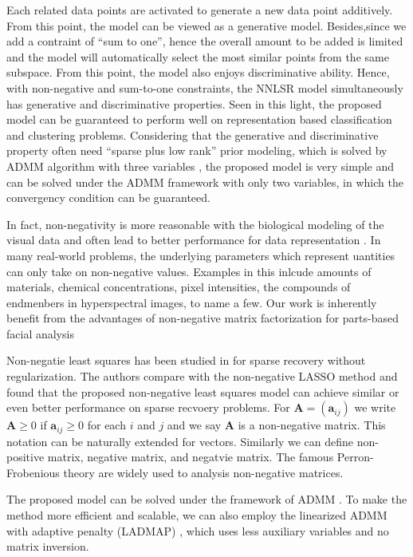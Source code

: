 \documentclass[10pt,twocolumn,letterpaper]{article}
\begin{document}
Each related data points are activated to generate a new data point additively. From this point, the model can be viewed as a generative model. Besides,since we add a contraint of ``sum to one'', hence the overall amount to be added is limited and the model will automatically select the most similar points from the same subspace. From this point, the model also enjoys discriminative ability. Hence, with non-negative and sum-to-one constraints, the NNLSR model simultaneously has generative and discriminative properties. Seen in this light, the proposed model can be guaranteed to perform well on representation based classification and clustering problems. Considering that the generative and discriminative property often need ``sparse plus low rank'' prior modeling, which is solved by ADMM algorithm with three variables \cite{nnlrs}, the proposed model is very simple and can be solved under the ADMM framework with only two variables, in which the convergency condition can be guaranteed.


In fact, non-negativity is more reasonable with the biological modeling of the visual data and often lead to better performance for data representation \cite{nmfnature}. In many real-world problems, the underlying parameters which represent uantities can only take on non-negative values. Examples in this inlcude amounts of materials, chemical concentrations, pixel intensities, the compounds of endmenbers in hyperspectral images, to name a few. Our work is inherently benefit from the advantages of non-negative matrix factorization for parts-based facial analysis \cite{nmfnature}
 
Non-negatie least squares has been studied in \cite{slawski2013non} for sparse recovery without regularization. The authors compare with the non-negative LASSO method \cite{kim2007interior} and found that the proposed non-negative least squares model can achieve similar or even better performance on sparse recvoery problems. For $\bm{A}=(\bm{a}_{ij})$ we write $\bm{A}\ge0$ if $\bm{a}_{ij}\ge0$ for each $i$ and $j$ and we say $\bm{A}$ is a non-negative matrix. This notation can be naturally extended for vectors. Similarly we can define non-positive matrix, negative matrix, and negatvie matrix. The famous Perron-Frobenious theory are widely used to analysis non-negative matrices.

The proposed model can be solved under the framework of ADMM \cite{admm}. To make the method more efficient and scalable, we can also employ the linearized ADMM with adaptive penalty (LADMAP) \cite{ladmap}, which uses less auxiliary variables and no matrix inversion.
\end{document}
